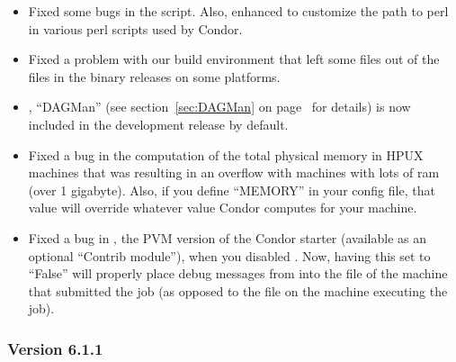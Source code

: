 \begin{itemize}

\item Fixed some bugs in the  script.
Also, enhanced  to customize the path to perl in
various perl scripts used by Condor.

\item Fixed a problem with our build environment that left some files
out of the  files in the binary releases on some
platforms. 

\item {}, ``DAGMan'' (see section~\ref{sec:DAGMan} on 
page~\pageref{sec:DAGMan} for details) is now included in the
development release by default.

\item Fixed a bug in the computation of the total physical memory in
HPUX machines that was resulting in an overflow with machines with
lots of ram (over 1 gigabyte).
Also, if you define ``MEMORY'' in your config file, that value will
override whatever value Condor computes for your machine.

\item Fixed a bug in , the PVM version of the
Condor starter (available as an optional ``Contrib module''), when you
disabled .
Now, having this set to ``False'' will properly place debug messages
from  into the  file of the
machine that submitted the job (as opposed to the 
file on the machine executing the job).  

\end{itemize}

\subsubsection{\label{sec:New-6-1-1}Version 6.1.1}

